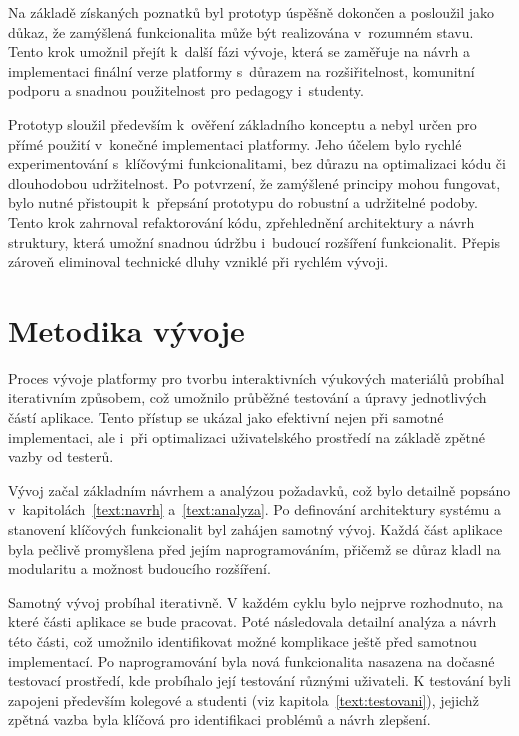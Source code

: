 Na základě získaných poznatků byl prototyp úspěšně dokončen a posloužil jako důkaz, že zamýšlená funkcionalita může být realizována v~rozumném stavu. 
Tento krok umožnil přejít k~další fázi vývoje, která se zaměřuje na návrh a implementaci finální verze platformy s~důrazem na rozšiřitelnost, komunitní podporu a snadnou použitelnost pro pedagogy i~studenty.

Prototyp sloužil především k~ověření základního konceptu a nebyl určen pro přímé použití v~konečné implementaci platformy. 
Jeho účelem bylo rychlé experimentování s~klíčovými funkcionalitami, bez důrazu na optimalizaci kódu či dlouhodobou udržitelnost. 
Po potvrzení, že zamýšlené principy mohou fungovat, bylo nutné přistoupit k~přepsání prototypu do robustní a udržitelné podoby. 
Tento krok zahrnoval refaktorování kódu, zpřehlednění architektury a návrh struktury, která umožní snadnou údržbu i~budoucí rozšíření funkcionalit. 
Přepis zároveň eliminoval technické dluhy vzniklé při rychlém vývoji.

\section{Metodika vývoje}\label{text:realizace/metodikaVyvoje}

Proces vývoje platformy pro tvorbu interaktivních výukových materiálů probíhal iterativním způsobem, což umožnilo průběžné testování a úpravy jednotlivých částí aplikace. 
Tento přístup se ukázal jako efektivní nejen při samotné implementaci, ale i~při optimalizaci uživatelského prostředí na základě zpětné vazby od testerů.

Vývoj začal základním návrhem a analýzou požadavků, což bylo detailně popsáno v~kapitolách~\ref{text:navrh} a~\ref{text:analyza}. 
Po definování architektury systému a stanovení klíčových funkcionalit byl zahájen samotný vývoj. 
Každá část aplikace byla pečlivě promyšlena před jejím naprogramováním, přičemž se důraz kladl na modularitu a možnost budoucího rozšíření.

Samotný vývoj probíhal iterativně. 
V každém cyklu bylo nejprve rozhodnuto, na které části aplikace se bude pracovat. 
Poté následovala detailní analýza a návrh této části, což umožnilo identifikovat možné komplikace ještě před samotnou implementací. 
Po naprogramování byla nová funkcionalita nasazena na dočasné testovací prostředí, kde probíhalo její testování různými uživateli. 
K testování byli zapojeni především kolegové a studenti (viz kapitola~\ref{text:testovani}), jejichž zpětná vazba byla klíčová pro identifikaci problémů a návrh zlepšení.

